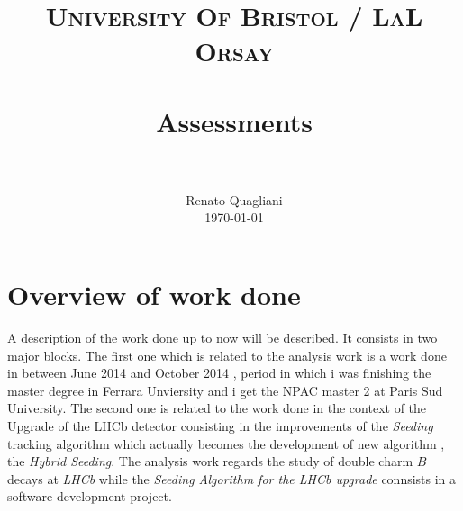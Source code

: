 \documentclass[paper=a4, fontsize=10pt]{scrartcl}
\title{
		\usefont{OT1}{bch}{b}{n}
		\normalfont \normalsize \textsc{University Of Bristol / LaL Orsay} \\ [25pt]
		\horrule{0.5pt} \\[0.4cm]
		\huge Assessments \\
		\horrule{2pt} \\[0.5cm]
}
\author{
		\normalfont 								\normalsize
        Renato Quagliani\\[-3pt]		\normalsize
        \today
}
\date{}
\numberwithin{equation}{section}		%
\numberwithin{figure}{section}			%
\numberwithin{table}{section}				%
\begin{document}
\maketitle
\section{Overview of work done}
A description of the work done up to now will be described. It consists in two major blocks. The first one which is related to the analysis work is a work done in between June 2014 and October 2014 , period in which i was finishing the master degree in Ferrara Unviersity and i get the NPAC master 2 at Paris Sud University. The second one is related to the work done in the context of the Upgrade of the LHCb detector consisting in the improvements of the \textit{Seeding} tracking algorithm which actually becomes the development of new algorithm , the \textit{Hybrid Seeding}.
The analysis work regards the study of double charm $B$ decays at \textit{LHCb} while the \textit{Seeding Algorithm for the LHCb upgrade} connsists in a software development project.
\end{document}

